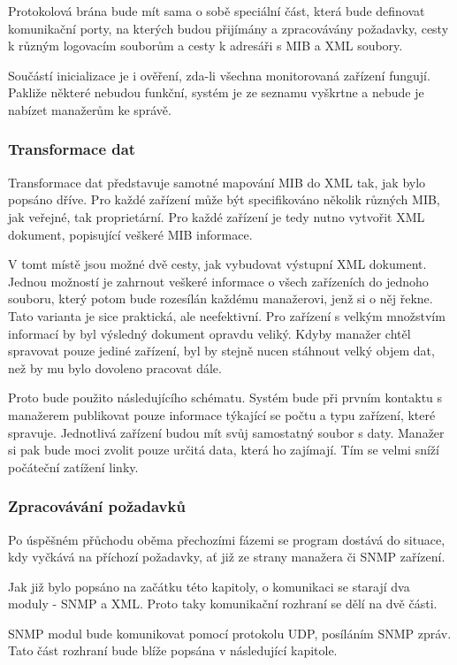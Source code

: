 Protokolová brána bude mít sama o sobě speciální část, která bude definovat komunikační porty, na kterých budou přijímány a zpracovávány požadavky, cesty k různým logovacím souborům a cesty k adresáři s MIB a XML soubory.

Součástí inicializace je i ověření, zda-li všechna monitorovaná zařízení fungují. Pakliže některé nebudou funkční, systém je ze seznamu vyškrtne a nebude je nabízet manažerům ke správě.

\subsubsection{Transformace dat}
Transformace dat představuje samotné mapování MIB do XML tak, jak bylo popsáno dříve. Pro každé zařízení může být specifikováno několik různých MIB, jak veřejné, tak proprietární. Pro každé
zařízení je tedy nutno vytvořit XML dokument, popisující veškeré MIB informace.

V tomt místě jsou možné dvě cesty, jak vybudovat výstupní XML dokument. Jednou možností je zahrnout veškeré informace o všech zařízeních do jednoho souboru, který potom bude rozesílán každému manažerovi, jenž si o něj řekne. Tato varianta
je sice praktická, ale neefektivní. Pro zařízení s velkým množstvím informací by byl výsledný dokument opravdu veliký. Kdyby manažer chtěl spravovat pouze jediné zařízení, byl by stejně nucen stáhnout velký objem dat, než
by mu bylo dovoleno pracovat dále.

Proto bude použito následujícího schématu. Systém bude při prvním kontaktu s manažerem publikovat pouze informace týkající se počtu a typu zařízení, které spravuje. Jednotlivá zařízení budou mít svůj samostatný soubor
s daty. Manažer si pak bude moci zvolit pouze určitá data, která ho zajímají. Tím se velmi sníží počáteční zatížení linky.

\subsubsection{Zpracovávání požadavků}
Po úspěšném přůchodu oběma přechozími fázemi se program dostává do situace, kdy vyčkává na příchozí požadavky, ať již ze strany manažera či SNMP zařízení.

Jak již bylo popsáno na začátku této kapitoly, o komunikaci se starají dva moduly - SNMP a XML. Proto taky komunikační rozhraní se dělí na dvě části.

SNMP modul bude komunikovat pomocí protokolu UDP, posíláním SNMP zpráv. Tato část rozhraní bude blíže popsána v následující kapitole.

